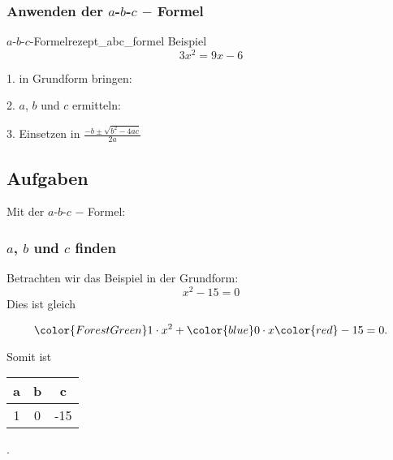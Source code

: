 \subsubsection{Anwenden der $a$-$b$-$c$ $-$ Formel}
\begin{rezept}{$a$-$b$-$c$-Formel}{rezept_abc_formel}
  Beispiel $$3x^2 = 9x - 6$$

  1. in Grundform bringen: 


2. $a$, $b$ und $c$ ermitteln:


3. Einsetzen in \large{ $\frac{-b \pm \sqrt{b^2-4ac}}{2a}$}

\end{rezept}

\subsection*{Aufgaben}
Mit der $a$-$b$-$c$ $-$ Formel:
\newpage


\subsubsection{$a$, $b$ und $c$ finden}
Betrachten wir das Beispiel in der Grundform:
$$x^2 - 15 = 0$$
Dies ist gleich

$$ {\color{ForestGreen}1\cdot{}}  x^2 + {\color{blue}0\cdot{}} x {
  \color{red} - 15} = 0.$$
  
Somit ist
\begin{tabular}{|c|c|c|}
    {\color{ForestGreen}a} & {\color{blue}b} &  {\color{red}  c} \\\hline
    {\color{ForestGreen}1} & {\color{blue}0} &  {\color{red}-15}
\end{tabular}.

